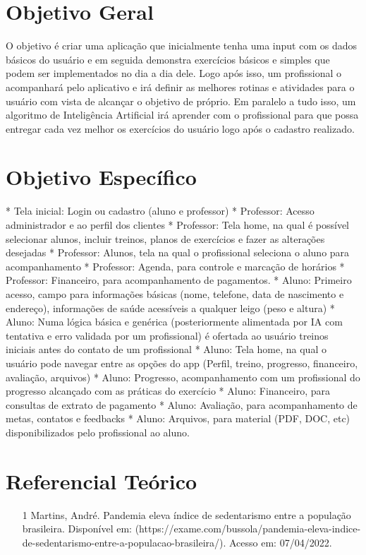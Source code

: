 \documentclass[conference]{IEEEtran}
\begin{document}
\section{Objetivo Geral}\label{AA}
O objetivo é criar uma aplicação que inicialmente tenha uma input com os dados básicos do usuário e em seguida demonstra exercícios básicos e simples que podem ser implementados no dia a dia dele. Logo após isso, um profissional o acompanhará pelo aplicativo e irá definir as melhores rotinas e atividades para o usuário com vista de alcançar o objetivo de próprio. Em paralelo a tudo isso, um algoritmo de Inteligência Artificial irá aprender com o profissional para que possa entregar cada vez melhor os exercícios do usuário logo após o cadastro realizado.

\section{Objetivo Específico}

* Tela inicial: Login ou cadastro (aluno e professor)
* Professor: Acesso administrador e ao perfil dos clientes
* Professor: Tela home, na qual é possível selecionar alunos, incluir treinos, planos de exercícios e fazer as alterações desejadas
* Professor: Alunos, tela na qual o profissional seleciona o aluno para acompanhamento
* Professor: Agenda, para controle e marcação de horários
* Professor: Financeiro, para acompanhamento de pagamentos.
* Aluno: Primeiro acesso, campo para informações básicas (nome, telefone, data de nascimento e endereço), informações de saúde acessíveis a qualquer leigo (peso e altura)
* Aluno: Numa lógica básica e genérica (posteriormente alimentada por IA com tentativa e erro validada por um profissional) é ofertada ao usuário treinos iniciais antes do contato de um profissional
* Aluno: Tela home, na qual o usuário pode navegar entre as opções do app (Perfil, treino, progresso, financeiro, avaliação, arquivos)
* Aluno: Progresso, acompanhamento com um profissional do progresso alcançado com as práticas do exercício
* Aluno: Financeiro, para consultas de extrato de pagamento
* Aluno: Avaliação, para acompanhamento de metas, contatos e feedbacks
* Aluno: Arquivos, para material (PDF, DOC, etc) disponibilizados pelo profissional ao aluno.


\section{Referencial Teórico}

\begin{itemize}
\item [1] Martins, André. Pandemia eleva índice de sedentarismo entre a população brasileira. Disponível em: (https://exame.com/bussola/pandemia-eleva-indice-de-sedentarismo-entre-a-populacao-brasileira/). Acesso em: 07/04/2022.

\end{itemize}
\end{document}
